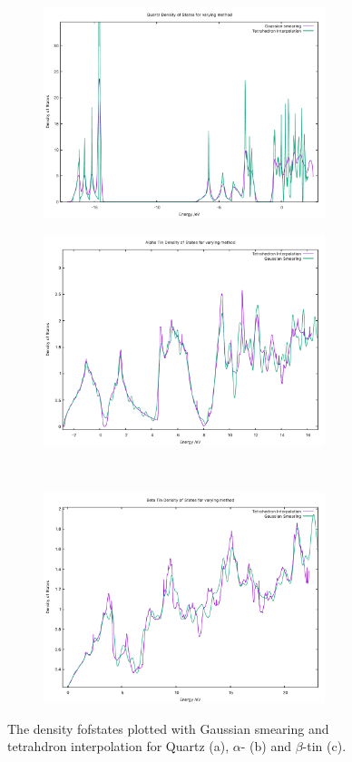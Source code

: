 \documentclass[12pt]{article}
\begin{document}
\begin{figure}[h!!!!!]
	\centering
	\begin{subfigure}[t]{0.5\textwidth}
		\includegraphics[width=8.2cm]{quartz-dos-data/quartz-method-dos.pdf}
		\label{fig:quartz-method-dos}
	\end{subfigure}%
	\begin{subfigure}[t]{0.5\textwidth}
		\includegraphics[width=8.2cm]{alpha-dos-data/alpha-method-dos.pdf}
		\label{fig:alpha-method-dos}
	\end{subfigure}%
	\\
	\begin{subfigure}[t]{0.5\textwidth}
		\includegraphics[width=8.2cm]{beta-dos-data/beta-method-dos.pdf}
		\label{fig:beta-method-dos}
	\end{subfigure}
	\caption{The density fofstates plotted with Gaussian smearing and tetrahdron interpolation for Quartz (a), $\alpha$- (b) and $\beta$-tin (c).}
	\label{fig:m-vary}
\end{figure}
\end{document}
